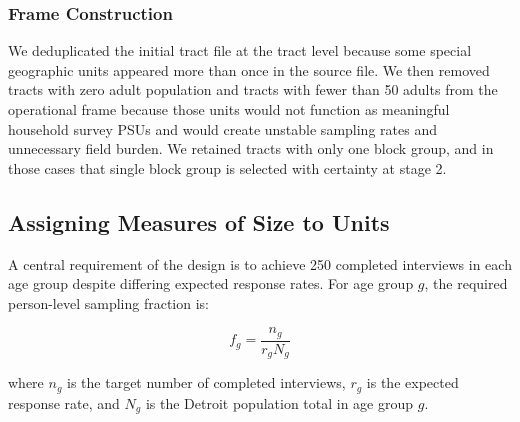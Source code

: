 \documentclass[
  11pt,
  letterpaper,
  DIV=11,
  numbers=noendperiod]{scrartcl}
\begin{document}
\subsubsection{Frame Construction}\label{frame-construction}

We deduplicated the initial tract file at the tract level because some
special geographic units appeared more than once in the source file. We
then removed tracts with zero adult population and tracts with fewer
than 50 adults from the operational frame because those units would not
function as meaningful household survey PSUs and would create unstable
sampling rates and unnecessary field burden. We retained tracts with
only one block group, and in those cases that single block group is
selected with certainty at stage 2.

\begin{table}[!h]
\centering
\caption{\label{tab:frame-cleaning-summary}Summary of Frame Construction}
\centering
{}
\end{table}

\subsection{Assigning Measures of Size to
Units}\label{assigning-measures-of-size-to-units}

A central requirement of the design is to achieve 250 completed
interviews in each age group despite differing expected response rates.
For age group \(g\), the required person-level sampling fraction is:

\[
f_g = \frac{n_g}{r_g N_g}
\]

where \(n_g\) is the target number of completed interviews, \(r_g\) is
the expected response rate, and \(N_g\) is the Detroit population total
in age group \(g\).
\end{document}
